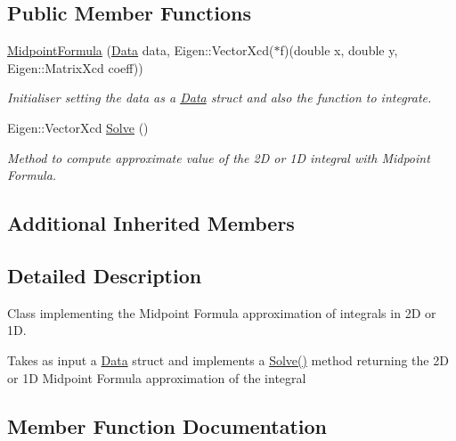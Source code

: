 \subsection*{Public Member Functions}
\begin{DoxyCompactItemize}
\item 
\mbox{\label{class_midpoint_formula_ad3c444776b53996d50dbf88a61c36c8c}} 
\hyperlink{class_midpoint_formula_ad3c444776b53996d50dbf88a61c36c8c}{Midpoint\+Formula} (\hyperlink{struct_data}{Data} data, Eigen\+::\+Vector\+Xcd($\ast$f)(double x, double y, Eigen\+::\+Matrix\+Xcd coeff))
\begin{DoxyCompactList}\small\item\em Initialiser setting the data as a \hyperlink{struct_data}{Data} struct and also the function to integrate. \end{DoxyCompactList}\item 
Eigen\+::\+Vector\+Xcd \hyperlink{class_midpoint_formula_add437323dfb0bc181b0051c5aaf80ba7}{Solve} ()
\begin{DoxyCompactList}\small\item\em Method to compute approximate value of the 2D or 1D integral with Midpoint Formula. \end{DoxyCompactList}\end{DoxyCompactItemize}
\subsection*{Additional Inherited Members}


\subsection{Detailed Description}
Class implementing the Midpoint Formula approximation of integrals in 2D or 1D. 

Takes as input a \hyperlink{struct_data}{Data} struct and implements a \hyperlink{class_midpoint_formula_add437323dfb0bc181b0051c5aaf80ba7}{Solve()} method returning the 2D or 1D Midpoint Formula approximation of the integral 

\subsection{Member Function Documentation}
\mbox{\label{class_midpoint_formula_add437323dfb0bc181b0051c5aaf80ba7}} 
